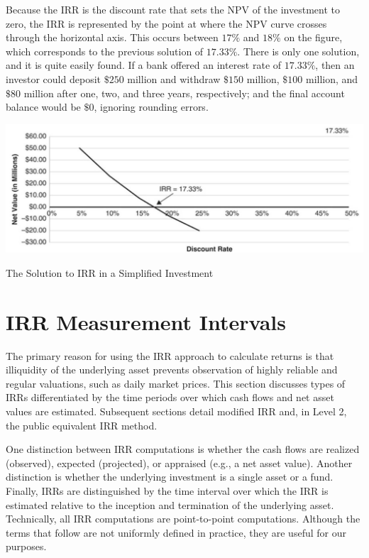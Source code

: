 \documentclass[11pt]{article}
\begin{document}
Because the IRR is the discount rate that sets the NPV of the investment to zero, the IRR is represented by the point at where the NPV curve crosses through the horizontal axis. This occurs between $17 \%$ and $18 \%$ on the figure, which corresponds to the previous solution of $17.33 \%$. There is only one solution, and it is quite easily found. If a bank offered an interest rate of $17.33 \%$, then an investor could deposit $\$ 250$ million and withdraw $\$ 150$ million, $\$ 100$ million, and $\$ 80$ million after one, two, and three years, respectively; and the final account balance would be $\$ 0$, ignoring rounding errors.

\begin{center}
\includegraphics[max width=\textwidth]{2024_04_10_52a8c38b9d0ded03b349g-3}
\end{center}

The Solution to IRR in a Simplified Investment

\section*{IRR Measurement Intervals}
The primary reason for using the IRR approach to calculate returns is that illiquidity of the underlying asset prevents observation of highly reliable and regular valuations, such as daily market prices. This section discusses types of IRRs differentiated by the time periods over which cash flows and net asset values are estimated. Subsequent sections detail modified IRR and, in Level 2, the public equivalent IRR method.

One distinction between IRR computations is whether the cash flows are realized (observed), expected (projected), or appraised (e.g., a net asset value). Another distinction is whether the underlying investment is a single asset or a fund. Finally, IRRs are distinguished by the time interval over which the IRR is estimated relative to the inception and termination of the underlying asset. Technically, all IRR computations are point-to-point computations. Although the terms that follow are not uniformly defined in practice, they are useful for our purposes.
\end{document}
